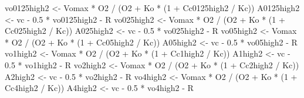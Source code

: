 \documentclass[
]{krantz}
\makeatletter
\newenvironment{Shaded}{\begin{snugshade}}{\end{snugshade}}
\newcommand{\DecValTok}[1]{\textcolor[rgb]{0.00,0.00,0.81}{#1}}
\newcommand{\FloatTok}[1]{\textcolor[rgb]{0.00,0.00,0.81}{#1}}
\newcommand{\NormalTok}[1]{#1}
\newcommand{\OtherTok}[1]{\textcolor[rgb]{0.56,0.35,0.01}{#1}}
\newcommand{\SpecialCharTok}[1]{\textcolor[rgb]{0.00,0.00,0.00}{#1}}
\newenvironment{kframe}{%
\medskip{}
\setlength{\fboxsep}{.8em}
 \def\at@end@of@kframe{}%
 \ifinner\ifhmode%
  \def\at@end@of@kframe{\end{minipage}}%
  \begin{minipage}{\columnwidth}%
 \fi\fi%
 \def\FrameCommand##1{\hskip\@totalleftmargin \hskip-\fboxsep
 \colorbox{shadecolor}{##1}\hskip-\fboxsep
     \hskip-\linewidth \hskip-\@totalleftmargin \hskip\columnwidth}%
 \MakeFramed {\advance\hsize-\width
   \@totalleftmargin\z@ \linewidth\hsize
   \@setminipage}}%
 {\par\unskip\endMakeFramed%
 \at@end@of@kframe}
\renewenvironment{Shaded}{\begin{kframe}}{\end{kframe}}
\makeatother
\begin{document}
\begin{Shaded}
\begin{Highlighting}[]
\NormalTok{vo0125high2 }\OtherTok{\textless{}{-}}\NormalTok{ Vomax }\SpecialCharTok{*}\NormalTok{ O2 }\SpecialCharTok{/}\NormalTok{ (O2 }\SpecialCharTok{+}\NormalTok{ Ko }\SpecialCharTok{*}\NormalTok{ (}\DecValTok{1} \SpecialCharTok{+}\NormalTok{ Cc0125high2 }\SpecialCharTok{/}\NormalTok{ Kc)) }
\NormalTok{A0125high2 }\OtherTok{\textless{}{-}}\NormalTok{ vc }\SpecialCharTok{{-}} \FloatTok{0.5} \SpecialCharTok{*}\NormalTok{ vo0125high2 }\SpecialCharTok{{-}}\NormalTok{ R }
\NormalTok{vo025high2 }\OtherTok{\textless{}{-}}\NormalTok{ Vomax }\SpecialCharTok{*}\NormalTok{ O2 }\SpecialCharTok{/}\NormalTok{ (O2 }\SpecialCharTok{+}\NormalTok{ Ko }\SpecialCharTok{*}\NormalTok{ (}\DecValTok{1} \SpecialCharTok{+}\NormalTok{ Cc025high2 }\SpecialCharTok{/}\NormalTok{ Kc)) }
\NormalTok{A025high2 }\OtherTok{\textless{}{-}}\NormalTok{ vc }\SpecialCharTok{{-}} \FloatTok{0.5} \SpecialCharTok{*}\NormalTok{ vo025high2 }\SpecialCharTok{{-}}\NormalTok{ R }
\NormalTok{vo05high2 }\OtherTok{\textless{}{-}}\NormalTok{ Vomax }\SpecialCharTok{*}\NormalTok{ O2 }\SpecialCharTok{/}\NormalTok{ (O2 }\SpecialCharTok{+}\NormalTok{ Ko }\SpecialCharTok{*}\NormalTok{ (}\DecValTok{1} \SpecialCharTok{+}\NormalTok{ Cc05high2 }\SpecialCharTok{/}\NormalTok{ Kc)) }
\NormalTok{A05high2 }\OtherTok{\textless{}{-}}\NormalTok{ vc }\SpecialCharTok{{-}} \FloatTok{0.5} \SpecialCharTok{*}\NormalTok{ vo05high2 }\SpecialCharTok{{-}}\NormalTok{ R }
\NormalTok{vo1high2 }\OtherTok{\textless{}{-}}\NormalTok{ Vomax }\SpecialCharTok{*}\NormalTok{ O2 }\SpecialCharTok{/}\NormalTok{ (O2 }\SpecialCharTok{+}\NormalTok{ Ko }\SpecialCharTok{*}\NormalTok{ (}\DecValTok{1} \SpecialCharTok{+}\NormalTok{ Cc1high2 }\SpecialCharTok{/}\NormalTok{ Kc)) }
\NormalTok{A1high2 }\OtherTok{\textless{}{-}}\NormalTok{ vc }\SpecialCharTok{{-}} \FloatTok{0.5} \SpecialCharTok{*}\NormalTok{ vo1high2 }\SpecialCharTok{{-}}\NormalTok{ R }
\NormalTok{vo2high2 }\OtherTok{\textless{}{-}}\NormalTok{ Vomax }\SpecialCharTok{*}\NormalTok{ O2 }\SpecialCharTok{/}\NormalTok{ (O2 }\SpecialCharTok{+}\NormalTok{ Ko }\SpecialCharTok{*}\NormalTok{ (}\DecValTok{1} \SpecialCharTok{+}\NormalTok{ Cc2high2 }\SpecialCharTok{/}\NormalTok{ Kc)) }
\NormalTok{A2high2 }\OtherTok{\textless{}{-}}\NormalTok{ vc }\SpecialCharTok{{-}} \FloatTok{0.5} \SpecialCharTok{*}\NormalTok{ vo2high2 }\SpecialCharTok{{-}}\NormalTok{ R }
\NormalTok{vo4high2 }\OtherTok{\textless{}{-}}\NormalTok{ Vomax }\SpecialCharTok{*}\NormalTok{ O2 }\SpecialCharTok{/}\NormalTok{ (O2 }\SpecialCharTok{+}\NormalTok{ Ko }\SpecialCharTok{*}\NormalTok{ (}\DecValTok{1} \SpecialCharTok{+}\NormalTok{ Cc4high2 }\SpecialCharTok{/}\NormalTok{ Kc)) }
\NormalTok{A4high2 }\OtherTok{\textless{}{-}}\NormalTok{ vc }\SpecialCharTok{{-}} \FloatTok{0.5} \SpecialCharTok{*}\NormalTok{ vo4high2 }\SpecialCharTok{{-}}\NormalTok{ R }


\end{Highlighting}
\end{Shaded}
\end{document}
